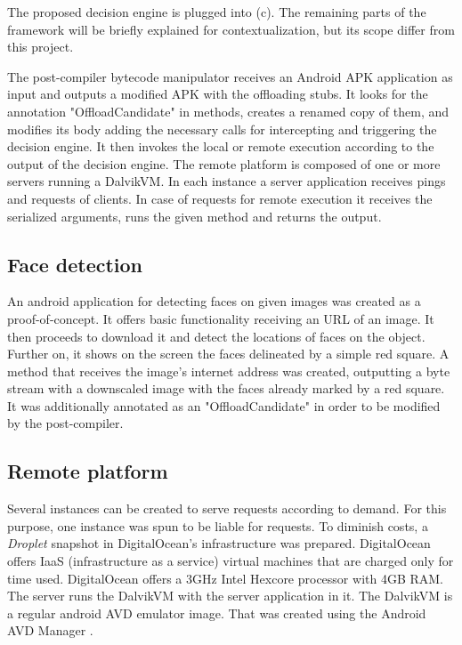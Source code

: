 \documentclass[10pt, conference, letterpaper]{IEEEtran}
\begin{document}
  The proposed decision engine is plugged into (c). The remaining parts of the framework will be briefly explained for contextualization, but its scope differ from this project.

  The post-compiler bytecode manipulator receives an Android APK application as input and outputs a modified APK with the offloading stubs. It looks for the annotation "OffloadCandidate" in methods, creates a renamed copy of them, and modifies its body adding the necessary calls for intercepting and triggering the decision engine. It then invokes the local or remote execution according to the output of the decision engine. The remote platform is composed of one or more servers running a DalvikVM. In each instance a server application receives pings and requests of clients. In case of requests for remote execution it receives the serialized arguments, runs the given method and returns the output.

  \subsection{Face detection}
  An android application for detecting faces on given images was created as a proof-of-concept. It offers basic functionality receiving an URL of an image. It then proceeds to download it and detect the locations of faces on the object. Further on, it shows on the screen the faces delineated by a simple red square. A method that receives the image's internet address was created, outputting a byte stream with a downscaled image with the faces already marked by a red square. It was additionally annotated as an "OffloadCandidate" in order to be modified by the post-compiler.

  \subsection{Remote platform}
  Several instances can be created to serve requests according to demand. For this purpose, one instance was spun to be liable for requests. To diminish costs, a \textit{Droplet} snapshot in DigitalOcean's infrastructure \cite{digitalocean} was prepared. DigitalOcean offers IaaS (infrastructure as a service) virtual machines that are charged only for time used. DigitalOcean offers a 3GHz Intel Hexcore processor with 4GB RAM. The server runs the DalvikVM with the server application in it. The DalvikVM is a regular android AVD emulator image. That was created using the Android AVD Manager \cite{androidavd}.
\end{document}
